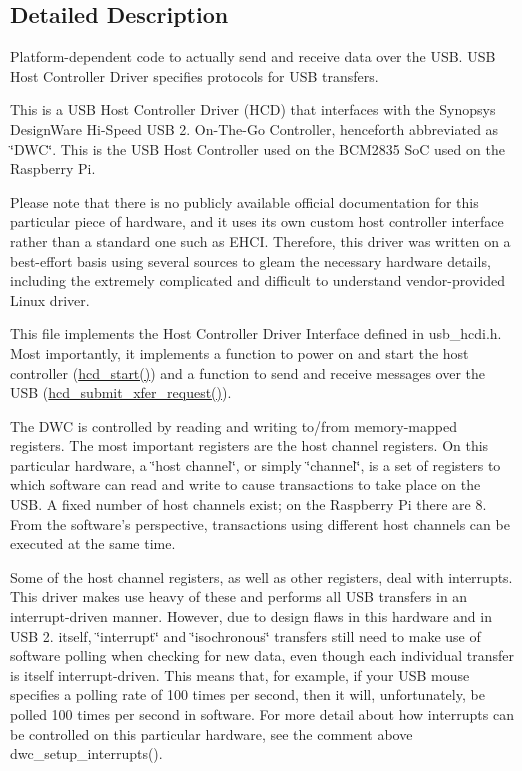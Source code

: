 \subsection{Detailed Description}
Platform-\/dependent code to actually send and receive data over the U\-S\-B. U\-S\-B Host Controller Driver specifies protocols for U\-S\-B transfers.

This is a U\-S\-B Host Controller Driver (H\-C\-D) that interfaces with the Synopsys Design\-Ware Hi-\/\-Speed U\-S\-B 2. On-\/\-The-\/\-Go Controller, henceforth abbreviated as \char`\"{}\-D\-W\-C\char`\"{}. This is the U\-S\-B Host Controller used on the B\-C\-M2835 So\-C used on the Raspberry Pi.

Please note that there is no publicly available official documentation for this particular piece of hardware, and it uses its own custom host controller interface rather than a standard one such as E\-H\-C\-I. Therefore, this driver was written on a best-\/effort basis using several sources to gleam the necessary hardware details, including the extremely complicated and difficult to understand vendor-\/provided Linux driver.

This file implements the Host Controller Driver Interface defined in usb\-\_\-hcdi.\-h. Most importantly, it implements a function to power on and start the host controller (\hyperlink{group__usbhcd_gaab6ab94dcc19ea7a80aed9af1c44ab7d}{hcd\-\_\-start()}) and a function to send and receive messages over the U\-S\-B (\hyperlink{group__usbhcd_ga72b7448515ed0c92480cb6737009e626}{hcd\-\_\-submit\-\_\-xfer\-\_\-request()}).

The D\-W\-C is controlled by reading and writing to/from memory-\/mapped registers. The most important registers are the host channel registers. On this particular hardware, a \char`\"{}host channel\char`\"{}, or simply \char`\"{}channel\char`\"{}, is a set of registers to which software can read and write to cause transactions to take place on the U\-S\-B. A fixed number of host channels exist; on the Raspberry Pi there are 8. From the software's perspective, transactions using different host channels can be executed at the same time.

Some of the host channel registers, as well as other registers, deal with interrupts. This driver makes use heavy of these and performs all U\-S\-B transfers in an interrupt-\/driven manner. However, due to design flaws in this hardware and in U\-S\-B 2. itself, \char`\"{}interrupt\char`\"{} and \char`\"{}isochronous\char`\"{} transfers still need to make use of software polling when checking for new data, even though each individual transfer is itself interrupt-\/driven. This means that, for example, if your U\-S\-B mouse specifies a polling rate of 100 times per second, then it will, unfortunately, be polled 100 times per second in software. For more detail about how interrupts can be controlled on this particular hardware, see the comment above dwc\-\_\-setup\-\_\-interrupts().

